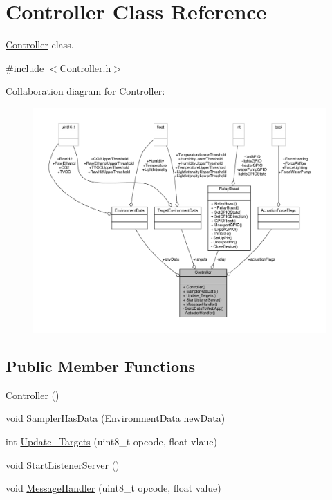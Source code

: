 \hypertarget{classController}{}\section{Controller Class Reference}
\label{classController}


\hyperlink{classController}{Controller} class.  




{\ttfamily \#include $<$Controller.\+h$>$}



Collaboration diagram for Controller\+:\nopagebreak
\begin{figure}[H]
\begin{center}
\leavevmode
\includegraphics[width=350pt]{classController__coll__graph}
\end{center}
\end{figure}
\subsection*{Public Member Functions}
\begin{DoxyCompactItemize}
\item 
\hyperlink{classController_a95c56822d667e94b031451729ce069a9}{Controller} ()
\item 
void \hyperlink{classController_a4b765eaaf8f72e964118967f86c265e2}{Sampler\+Has\+Data} (\hyperlink{structEnvironmentData}{Environment\+Data} new\+Data)
\item 
int \hyperlink{classController_a0eb08a1d38b2c79e2d140476fd097f24}{Update\+\_\+\+Targets} (uint8\+\_\+t opcode, float vlaue)
\item 
void \hyperlink{classController_a64173dd00be020975d7db533cd280c15}{Start\+Listener\+Server} ()
\item 
void \hyperlink{classController_affbf340fed1aca0172f336bcb2db8c8a}{Message\+Handler} (uint8\+\_\+t opcode, float value)
\end{DoxyCompactItemize}
